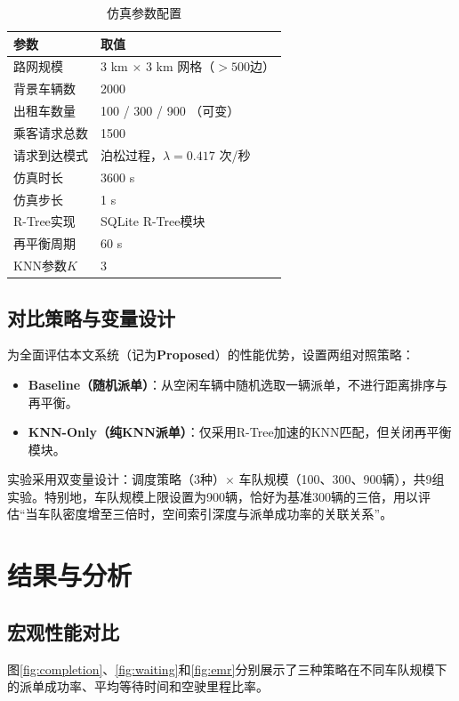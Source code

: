 \documentclass[conference]{IEEEtran}
\begin{document}
\begin{table}[htbp]
\centering
\caption{仿真参数配置}
\label{tab:config}
\begin{tabular}{@{}ll@{}}
\toprule
\textbf{参数} & \textbf{取值} \\
\midrule
路网规模 & 3 km $\times$ 3 km 网格（$>500$边） \\
背景车辆数 & 2000 \\
出租车数量 & 100 / 300 / 900 （可变） \\
乘客请求总数 & 1500 \\
请求到达模式 & 泊松过程，$\lambda = 0.417$ 次/秒 \\
仿真时长 & 3600 s \\
仿真步长 & 1 s \\
R-Tree实现 & SQLite R-Tree模块 \\
再平衡周期 & 60 s \\
KNN参数$K$ & 3 \\
\bottomrule
\end{tabular}
\end{table}

\subsection{对比策略与变量设计}
为全面评估本文系统（记为\textbf{Proposed}）的性能优势，设置两组对照策略：
\begin{itemize}
    \item \textbf{Baseline（随机派单）}：从空闲车辆中随机选取一辆派单，不进行距离排序与再平衡。
    \item \textbf{KNN-Only（纯KNN派单）}：仅采用R-Tree加速的KNN匹配，但关闭再平衡模块。
\end{itemize}
实验采用双变量设计：调度策略（3种）$\times$ 车队规模（100、300、900辆），共9组实验。特别地，车队规模上限设置为900辆，恰好为基准300辆的三倍，用以评估“当车队密度增至三倍时，空间索引深度与派单成功率的关联关系”。

\section{结果与分析}

\subsection{宏观性能对比}
图\ref{fig:completion}、\ref{fig:waiting}和\ref{fig:emr}分别展示了三种策略在不同车队规模下的派单成功率、平均等待时间和空驶里程比率。
\end{document}
